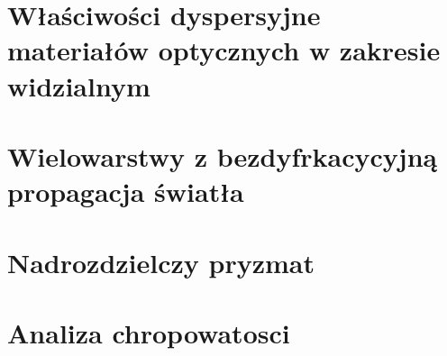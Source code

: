 
\section{Właściwości dyspersyjne materiałów optycznych w zakresie widzialnym}

\section{Wielowarstwy z bezdyfrkacycyjną propagacja światła}

\section{Nadrozdzielczy pryzmat}


\section{Analiza chropowatosci}



